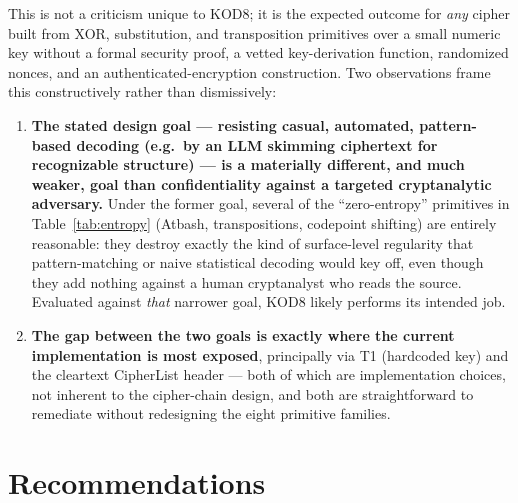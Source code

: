 \documentclass[11pt]{article}
\begin{document}
This is not a criticism unique to KOD8; it is the expected outcome for
\emph{any} cipher built from XOR, substitution, and transposition
primitives over a small numeric key without a formal security proof,
a vetted key-derivation function, randomized nonces, and an
authenticated-encryption construction. Two observations frame this
constructively rather than dismissively:

\begin{enumerate}[leftmargin=1.6em]
\item \textbf{The stated design goal — resisting casual, automated,
pattern-based decoding (e.g.\ by an LLM skimming ciphertext for
recognizable structure) — is a materially different, and much weaker,
goal than confidentiality against a targeted cryptanalytic adversary.}
Under the former goal, several of the ``zero-entropy'' primitives in
Table~\ref{tab:entropy} (Atbash, transpositions, codepoint shifting)
are entirely reasonable: they destroy exactly the kind of surface-level
regularity that pattern-matching or naive statistical decoding would
key off, even though they add nothing against a human cryptanalyst who
reads the source. Evaluated against \emph{that} narrower goal, KOD8
likely performs its intended job.
\item \textbf{The gap between the two goals is exactly where the
current implementation is most exposed}, principally via T1 (hardcoded
key) and the cleartext CipherList header — both of which are
implementation choices, not inherent to the cipher-chain design, and
both are straightforward to remediate without redesigning the eight
primitive families.
\end{enumerate}

\section{Recommendations}
\end{document}
